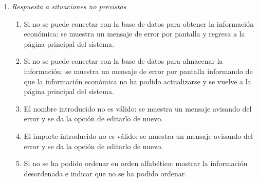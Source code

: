\begin{enumerate}
	\item \textit{Respuesta a situaciones no previstas}
	\begin{enumerate}
		\item Si no se puede conectar con la base de datos para obtener la información económica: se muestra un mensaje de error por pantalla y regresa a la página principal del sistema.
		\item Si no se puede conectar con la base de datos para almacenar la información: se muestra un mensaje de error por pantalla informando de que la información económica no ha podido actualizarse y se vuelve a la página principal del sistema.
		\item El nombre introducido no es válido: se muestra un mensaje avisando del error y se da la opción de editarlo de nuevo.
		\item El importe introducido no es válido: se muestra un mensaje avisando del error y se da la opción de editarlo de nuevo.
		\item Si no se ha podido ordenar en orden alfabético: mostrar la información desordenada e indicar que no se ha podido ordenar.
	\end{enumerate}

\end{enumerate}
